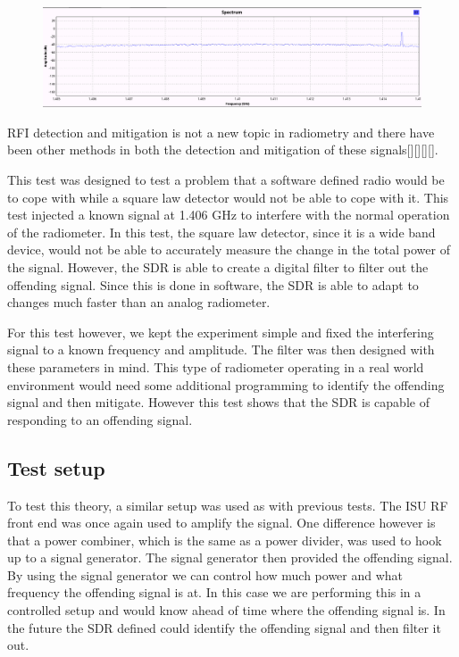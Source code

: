 \begin{figure}[h!tb] \centering

\includegraphics[width=\textwidth]{Images/interfering_signal_edit.png}

\label{inter_signal}
\end{figure}

RFI detection and mitigation is not a new topic in radiometry and there have been other methods in both the detection and mitigation of these signals[\cite{Forte}][\cite{McIntyre_RFI}][\cite{DeRoo}][\cite{Ellingson}].

This test was designed to test a problem that a software defined radio would be to cope with while a square law detector would not be able to cope with it.  This test injected a known signal at 1.406 GHz to interfere with the normal operation of the radiometer.  In this test, the square law detector, since it is a wide band device, would not be able to accurately measure the change in the total power of the signal.  However, the SDR is able to create a digital filter to filter out the offending signal.  Since this is done in software, the SDR is able to adapt to changes much faster than an analog radiometer.

For this test however, we kept the experiment simple and fixed the interfering signal to a known frequency and amplitude.  The filter was then designed with these parameters in mind.  This type of radiometer operating in a real world environment would need some additional programming to identify the offending signal and then mitigate.  However this test shows that the SDR is capable of responding to an offending signal.

\subsection{Test setup}
To test this theory, a similar setup was used as with previous tests.  The ISU RF front end was once again used to amplify the signal.  One difference however is that a power combiner, which is the same as a power divider, was used to hook up to a signal generator.  The signal generator then provided the offending signal.  By using the signal generator we can control how much power and what frequency the offending signal is at.  In this case we are performing this in a controlled setup and would know ahead of time where the offending signal is.  In the future the SDR defined could identify the offending signal and then filter it out.

